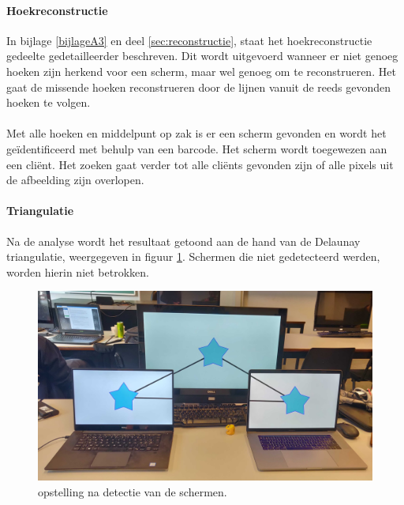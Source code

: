 \paragraph{Hoekreconstructie}
In bijlage \ref{bijlageA3} en deel \ref{sec:reconstructie}, staat het hoekreconstructie gedeelte gedetailleerder beschreven. Dit wordt uitgevoerd wanneer er niet genoeg hoeken zijn herkend voor een scherm, maar wel genoeg om te reconstrueren. Het gaat de missende hoeken reconstrueren door de lijnen vanuit de reeds gevonden hoeken te volgen.
\paragraph{}
Met alle hoeken en middelpunt op zak is er een scherm gevonden en wordt het geïdentificeerd met behulp van een barcode. Het scherm wordt toegewezen aan een cliënt. Het zoeken gaat verder tot alle cliënts gevonden zijn of alle pixels uit de afbeelding zijn overlopen.

\paragraph{Triangulatie}
Na de analyse wordt het resultaat getoond aan de hand van de Delaunay triangulatie, weergegeven in figuur \ref{fig:triang}. Schermen die niet gedetecteerd werden, worden hierin niet betrokken.
\begin{figure}[H]
	\centering
	\includegraphics[scale=0.09]{img/triang.jpg}
	\caption{opstelling na detectie van de schermen.}
	\label{fig:triang}
\end{figure}

